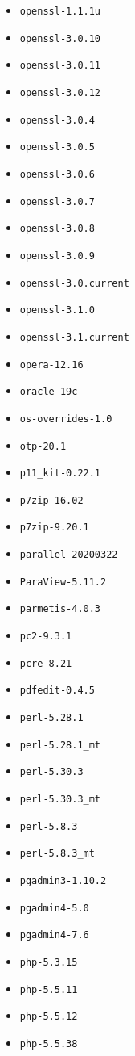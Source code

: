 \begin{itemize}
\item \verb|openssl-1.1.1u|
\item \verb|openssl-3.0.10|
\item \verb|openssl-3.0.11|
\item \verb|openssl-3.0.12|
\item \verb|openssl-3.0.4|
\item \verb|openssl-3.0.5|
\item \verb|openssl-3.0.6|
\item \verb|openssl-3.0.7|
\item \verb|openssl-3.0.8|
\item \verb|openssl-3.0.9|
\item \verb|openssl-3.0.current|
\item \verb|openssl-3.1.0|
\item \verb|openssl-3.1.current|
\item \verb|opera-12.16|
\item \verb|oracle-19c|
\item \verb|os-overrides-1.0|
\item \verb|otp-20.1|
\item \verb|p11_kit-0.22.1|
\item \verb|p7zip-16.02|
\item \verb|p7zip-9.20.1|
\item \verb|parallel-20200322|
\item \verb|ParaView-5.11.2|
\item \verb|parmetis-4.0.3|
\item \verb|pc2-9.3.1|
\item \verb|pcre-8.21|
\item \verb|pdfedit-0.4.5|
\item \verb|perl-5.28.1|
\item \verb|perl-5.28.1_mt|
\item \verb|perl-5.30.3|
\item \verb|perl-5.30.3_mt|
\item \verb|perl-5.8.3|
\item \verb|perl-5.8.3_mt|
\item \verb|pgadmin3-1.10.2|
\item \verb|pgadmin4-5.0|
\item \verb|pgadmin4-7.6|
\item \verb|php-5.3.15|
\item \verb|php-5.5.11|
\item \verb|php-5.5.12|
\item \verb|php-5.5.38|

\end{itemize}
